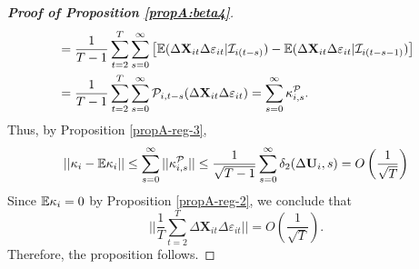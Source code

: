\begin{proof}[\textnormal{\textbf{Proof of Proposition \ref{propA:beta4}}}]
\begin{align*}
&= \frac{1}{T-1}\sum_{t=2}^T \sum_{s=0}^\infty \big[ \mathbb{E} ( \Delta \mathbf{X}_{it}\Delta \varepsilon_{it}|\mathcal{I}_{i(t-s)} ) - \mathbb{E} ( \Delta \mathbf{X}_{it}\Delta \varepsilon_{it}|\mathcal{I}_{i(t-s-1)} )  \big] \\
&= \frac{1}{T-1}\sum_{t=2}^T \sum_{s=0}^\infty \mathcal{P}_{i, t-s} (\Delta \mathbf{X}_{it}\Delta \varepsilon_{it}) = \sum_{s=0}^\infty \kappa_{i, s}^{\mathcal{P}}.
\end{align*}
Thus, by Proposition \ref{propA-reg-3},
\[ || \kappa_i - \mathbb{E} \kappa_i || \leq \sum_{s=0}^\infty ||\kappa_{i, s}^{\mathcal{P}} || \leq \frac{1}{\sqrt{T-1}}\sum_{s=0}^\infty \delta_2(\Delta \mathbf{U}_i, s) = O\left(\frac{1}{\sqrt{T}}\right)
\]
Since $\mathbb{E} \kappa_i = 0$ by Proposition \ref{propA-reg-2}, we conclude that
\[  \Big|\Big| \frac{1}{T}\sum_{t=2}^T  \Delta \mathbf{X}_{it}\Delta \varepsilon_{it} \Big|\Big| = O\left(\frac{1}{\sqrt{T}}\right).
\]
Therefore, the proposition follows.
\end{proof}


